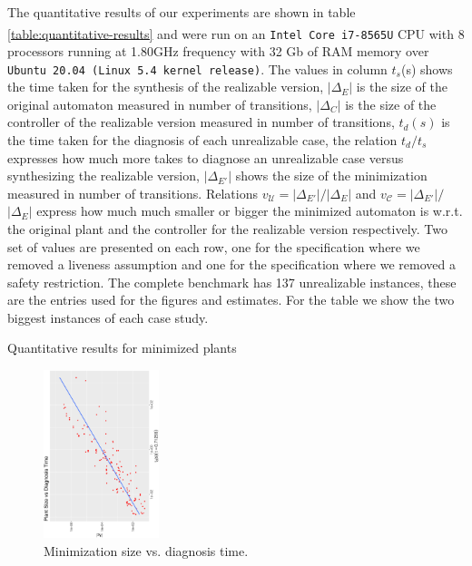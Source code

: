 The quantitative results of our experiments are shown in table 
\ref{table:quantitative-results} and were run on an 
\texttt{Intel\textsuperscript{\textregistered} Core\textsuperscript{\texttrademark}
 i7-8565U} CPU with 8 processors running at 1.80GHz frequency
with 32 Gb of RAM memory over \texttt{Ubuntu 20.04 (Linux 5.4 kernel release)}.
 The values in column $t_{s}$(s) shows the time taken for the synthesis of the realizable version, $|\Delta_E|$ is the size of the original automaton measured in number of transitions, $|\Delta_C|$ is the size of the controller of the realizable version measured in number of transitions, $t_{d}(s)$ is the time taken for the diagnosis of each unrealizable case, the relation $t_{d}/t_{s}$ expresses how much more takes to diagnose an unrealizable case versus synthesizing the realizable version, $|\Delta_{E'}|$ shows the size of the  minimization measured in number of transitions. Relations $v_{\mathcal{U}}$$=$$|\Delta_{E'}|$$/$$|\Delta_{E}|$ and $v_{\mathcal{C}}$$=$$|\Delta_{E'}|$$/$$|\Delta_{E}|$ express how much much smaller or bigger the minimized automaton is w.r.t. the original plant and the controller for the realizable version respectively. Two set of values are presented on each row, one for the specification where we removed a liveness assumption and one for the specification where we removed a safety restriction.
 The complete benchmark has 137 unrealizable instances, these are the entries used for the figures and estimates. 
For the table we show the two biggest instances of each case study.
\begin{table}
	\footnotesize
	\resizebox{\textwidth}{!} {

}
	\normalsize
  \caption{Quantitative results for minimized plants}
  \label{table:quantitative-results}
  \vspace{-1em}
 \end{table}
\begin{figure}[bt]
	\centering
	\SmallPicture
	\includegraphics[width=0.3\textwidth, angle=-90]{../experimental_setting/tmp_results/size_vs_diag_time.ps}
	\vspace*{-2mm}
	\caption{Minimization size vs. diagnosis time.}
	\label{fig:size_vs_diag_time}
	\vspace*{-4mm}
	\MediumPicture
\end{figure}
